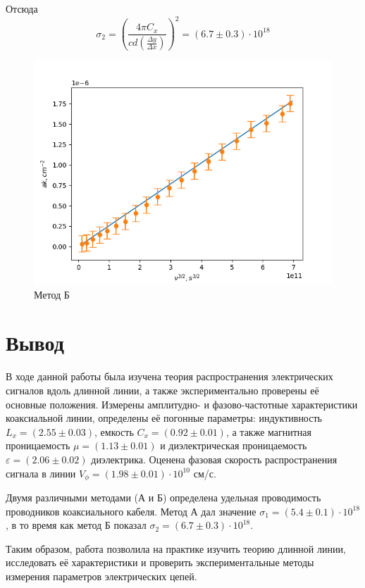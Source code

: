 \documentclass[a4paper]{article}
\begin{document}
Отсюда 
\begin{equation}
    \sigma_2 = \left( \frac{4\pi C_x}{cd \left( \frac{\Delta y}{\Delta x}\right)} \right)^2 = (6.7 \pm 0.3) \cdot 10^18
\end{equation}

\begin{figure}[h!]
    \centering
    \includegraphics[width=0.6\pdfpagewidth]{graph4.png}
    \caption{Метод Б}
\end{figure}

\section{Вывод}

В ходе данной работы была изучена теория распространения электрических сигналов вдоль длинной линии, а также экспериментально проверены её основные положения. Измерены амплитудно- и фазово-частотные характеристики коаксиальной линии, определены её погонные параметры: индуктивность $L_x = (2.55 \pm 0.03)$, емкость $C_x = (0.92 \pm 0.01)$, а также магнитная проницаемость $\mu = (1.13 \pm 0.01)$ и диэлектрическая проницаемость $\varepsilon = (2.06 \pm 0.02)$ диэлектрика. Оценена фазовая скорость распространения сигнала в линии $V_\phi = (1.98 \pm 0.01) \cdot 10^{10}$ см/с.

Двумя различными методами (А и Б) определена удельная проводимость проводников коаксиального кабеля. Метод А дал значение $\sigma_1 = (5.4 \pm 0.1) \cdot 10^{18}$, в то время как метод Б показал $\sigma_2 = (6.7 \pm 0.3) \cdot 10^18 $.

Таким образом, работа позволила на практике изучить теорию длинной линии, исследовать её характеристики и проверить экспериментальные методы измерения параметров электрических цепей.
\end{document}

